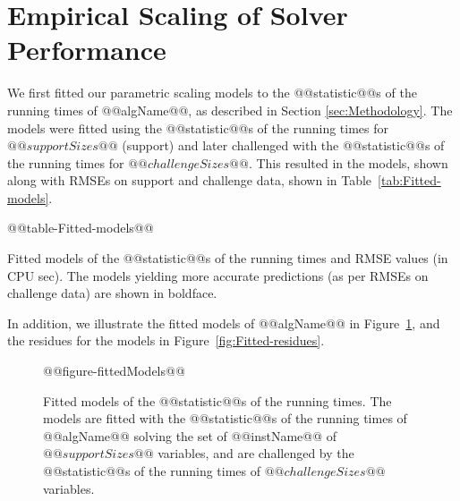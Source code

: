 % 
% 
% 
% 

\section{Empirical Scaling of Solver Performance}

\label{sec:Results}

We first fitted our parametric scaling models to the @@statistic@@s of the  running times
of @@algName@@, as described in Section \ref{sec:Methodology}. The
models were fitted using the @@statistic@@s of the  running times for $@@supportSizes@@$
(support) and later challenged with the @@statistic@@s of the  running times for $@@challengeSizes@@$.
This resulted in the models, shown along with RMSEs on support and
challenge data, shown in Table~\ref{tab:Fitted-models}.
\begin{table}[tb]
\begin{centering}
@@table-Fitted-models@@
% 
\par\end{centering}

\caption{\label{tab:Fitted-models}Fitted models of the @@statistic@@s of the  running times and RMSE
values (in CPU sec). The models yielding more
accurate predictions (as per RMSEs on challenge data) are shown in
boldface.}
\end{table}
In addition, we illustrate the fitted models of @@algName@@ in Figure~\ref{fig:Fitted-models},
and the residues for the models in Figure~\ref{fig:Fitted-residues}.
\begin{figure}[tb]
\noindent \begin{centering}
@@figure-fittedModels@@
\par\end{centering}

\caption{\label{fig:Fitted-models} Fitted models of the @@statistic@@s of the  running times. 
The models are fitted with the @@statistic@@s of the  running times of
@@algName@@ solving the set of @@instName@@ 
of $@@supportSizes@@$ variables, and are challenged by the @@statistic@@s of the 
running times of $@@challengeSizes@@$ variables.}
\end{figure}


